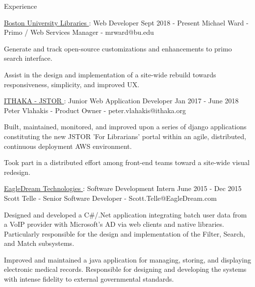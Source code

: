 \documentclass{resume} %
\begin{document}
  \begin{rSection}{Experience}

    \begin{rSubsection}{\underline{Boston University Libraries }: Web Developer }{ Sept 2018 - Present }{ Michael Ward - Primo / Web Services Manager - mrward@bu.edu }

      \item Generate and track open-source customizations and enhancements to primo search interface.

      \item Assist in the design and implementation of a site-wide rebuild towards responsiveness, simplicity, and improved UX.

    \end{rSubsection}

    \begin{rSubsection}{\underline{ITHAKA - JSTOR }: Junior Web Application Developer }{ Jan 2017 - June 2018 }{ Peter Vlahakis - Product Owner - peter.vlahakis@ithaka.org }

      \item Built, maintained, monitored, and improved upon a series of django applications constituting the new JSTOR 'For Librarians' portal within an agile, distributed, continuous deployment AWS environment.

      \item Took part in a distributed effort among front-end teams toward a site-wide visual redesign.

    \end{rSubsection}

    \begin{rSubsection}{\underline{EagleDream Technologies }: Software Development Intern }{ June 2015 - Dec 2015 }{ Scott Telle - Senior Software Developer - Scott.Telle@EagleDream.com }

      \item Designed and developed a C\#/.Net application integrating batch user data from a VoIP provider with Microsoft’s AD via web clients and native libraries. Particularly responsible for the design and implementation of the Filter, Search, and Match subsystems.

      \item Improved and maintained a java application for managing, storing, and displaying electronic medical records. Responsible for designing and developing the systems with intense fidelity to external governmental standards.

    \end{rSubsection}

  \end{rSection}
\end{document}
